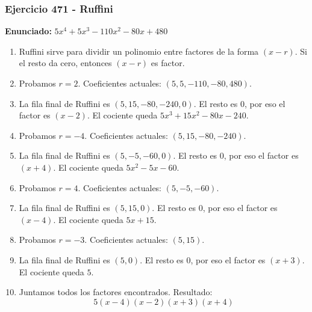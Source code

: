\documentclass[11pt,a4paper]{article}
\begin{document}
\subsubsection*{Ejercicio 471 - Ruffini}
\textbf{Enunciado:} $ 5 x^{4} + 5 x^{3} - 110 x^{2} - 80 x + 480 $\par
\begin{enumerate}[leftmargin=2em]
\item Ruffini sirve para dividir un polinomio entre factores de la forma \((x-r)\). Si el resto da cero, entonces \((x-r)\) es factor.
\item Probamos \(r=2\). Coeficientes actuales: \((5, 5, -110, -80, 480)\).
\item La fila final de Ruffini es \((5, 15, -80, -240, 0)\). El resto es \(0\), por eso el factor es \((x-2)\). El cociente queda \(5 x^{3} + 15 x^{2} - 80 x - 240\).
\item Probamos \(r=-4\). Coeficientes actuales: \((5, 15, -80, -240)\).
\item La fila final de Ruffini es \((5, -5, -60, 0)\). El resto es \(0\), por eso el factor es \((x+4)\). El cociente queda \(5 x^{2} - 5 x - 60\).
\item Probamos \(r=4\). Coeficientes actuales: \((5, -5, -60)\).
\item La fila final de Ruffini es \((5, 15, 0)\). El resto es \(0\), por eso el factor es \((x-4)\). El cociente queda \(5 x + 15\).
\item Probamos \(r=-3\). Coeficientes actuales: \((5, 15)\).
\item La fila final de Ruffini es \((5, 0)\). El resto es \(0\), por eso el factor es \((x+3)\). El cociente queda \(5\).
\item Juntamos todos los factores encontrados. Resultado: \[\boxed{5 \left(x - 4\right) \left(x - 2\right) \left(x + 3\right) \left(x + 4\right)}\]
\end{enumerate}

\vspace{0.2cm}
\end{document}
